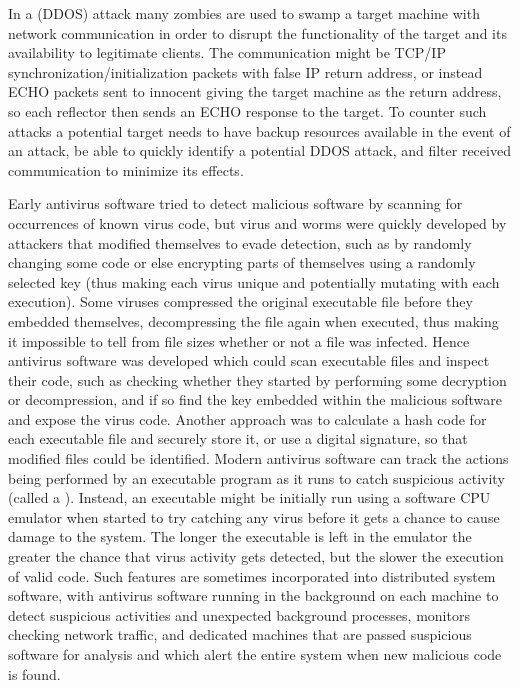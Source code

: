 In a  (DDOS) attack many zombies
are used to swamp a target machine with network communication in order to
disrupt the functionality of the target and its availability to legitimate clients.
The communication might be TCP/IP synchronization/initialization packets with false IP return
address, or instead ECHO packets sent to innocent  giving the target machine
as the return address, so each reflector then sends an ECHO response
to the target. To counter such attacks a potential target needs to have backup
resources available in the event of an attack, be able to quickly identify a
potential DDOS attack, and filter received communication to minimize its effects.

Early antivirus software tried to detect malicious software by scanning for occurrences
of known virus code, but virus and worms were quickly developed by attackers that
modified themselves to evade detection, such as by randomly changing some code or else
encrypting parts of themselves using a randomly selected key (thus making
each virus unique and potentially mutating with each execution).
Some viruses compressed the original executable file before they embedded themselves,
decompressing the file again when executed, thus making it impossible to tell from
file sizes whether or not a file was infected.
Hence antivirus software was developed which could scan executable files and inspect
their code, such as checking whether they started by performing some
decryption or decompression, and if so find the key embedded within the malicious software
and expose the virus code.
Another approach was to calculate a hash code for each executable file and securely store
it, or use a digital signature, so that modified files could be identified.
Modern antivirus software can track the actions being performed by
an executable program as it runs to catch suspicious activity (called a ).
Instead, an executable might be initially run using a software CPU emulator when started
to try catching any virus before it gets a chance to cause damage to the system.
The longer the executable is left in the emulator the greater the chance that
virus activity gets detected, but the slower the execution of valid code.
Such features are sometimes incorporated into distributed system software,
with antivirus software running in the background on each machine to detect suspicious
activities and unexpected background processes, monitors checking network traffic,
and dedicated machines that are passed suspicious software for analysis and which
alert the entire system when new malicious code is found.


